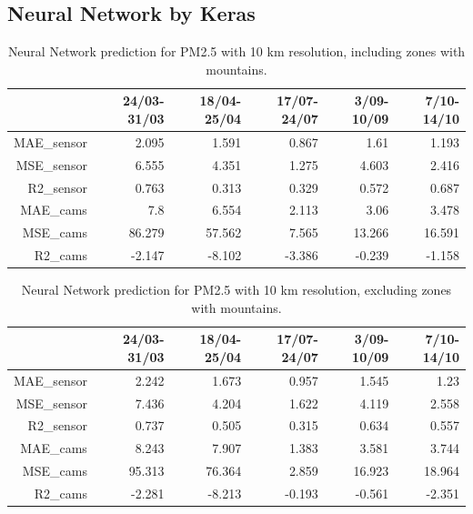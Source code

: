 \subsection{Neural Network by Keras}

\begin{table}[H]
\begin{tabular}{rrrrrr}
\hline
     &   24/03-31/03 &   18/04-25/04 &   17/07-24/07 &   3/09-10/09 &   7/10-14/10 \\
\hline
  MAE\_sensor   &            2.095 &            1.591 &            0.867 &            1.61  &            1.193 \\
  MSE\_sensor   &            6.555 &            4.351 &            1.275 &            4.603 &            2.416 \\
  R2\_sensor    &            0.763 &            0.313 &            0.329 &            0.572 &            0.687 \\
  MAE\_cams     &            7.8   &            6.554 &            2.113 &            3.06  &            3.478 \\
  MSE\_cams     &           86.279 &           57.562 &            7.565 &           13.266 &           16.591 \\
  R2\_cams      &           -2.147 &           -8.102 &           -3.386 &           -0.239 &           -1.158 \\
\hline
\end{tabular}
\caption{Neural Network prediction for PM2.5 with 10 km resolution, including zones with mountains.}
\end{table}

\begin{table}[H]
\begin{tabular}{rrrrrr}
\hline
    &   24/03-31/03 &   18/04-25/04 &   17/07-24/07 &   3/09-10/09 &   7/10-14/10 \\
\hline
  MAE\_sensor   &            2.242 &            1.673 &            0.957 &            1.545 &            1.23  \\
 MSE\_sensor   &            7.436 &            4.204 &            1.622 &            4.119 &            2.558 \\
  R2\_sensor    &            0.737 &            0.505 &            0.315 &            0.634 &            0.557 \\
  MAE\_cams     &            8.243 &            7.907 &            1.383 &            3.581 &            3.744 \\
  MSE\_cams     &           95.313 &           76.364 &            2.859 &           16.923 &           18.964 \\
  R2\_cams      &           -2.281 &           -8.213 &           -0.193 &           -0.561 &           -2.351 \\
\hline
\end{tabular}
\caption{Neural Network prediction for PM2.5 with 10 km resolution, excluding zones with mountains.}
\end{table}

